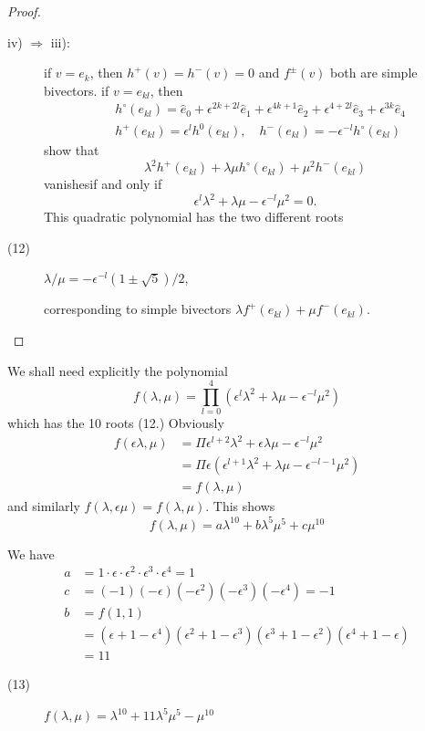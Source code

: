 \begin{proof}
\begin{description}
\item[iv) $\Rightarrow$ iii):] if $v=e_{k}$, then
$h^{+}(v)=h^{-}(v)=0$ and $f^{\pm}(v)$ both are simple bivectors. if
$v=e_{kl}$, then
\begin{align*}
&
h^{\circ}(e_{kl})=\widehat{e}_{0}+\epsilon^{2k+2l}\widehat{e}_{1}+\epsilon^{4k+1}\widehat{e}_{2}+\epsilon^{4+2l}\widehat{e}_{3}+\epsilon^{3k}\widehat{e}_{4}\\
& h^{+}(e_{kl})=\epsilon^{l}h^{0}(e_{kl}),\quad
h^{-}(e_{kl})=-\epsilon^{-l}h^{\circ}(e_{kl}) 
\end{align*}
show that
$$
\lambda^{2}h^{+}(e_{kl})+\lambda\mu
h^{\circ}(e_{kl})+\mu^{2}h^{-}(e_{kl}) 
$$
vanishes\pageoriginale if and only if
$$
\epsilon^{l}\lambda^{2}+\lambda\mu-\epsilon^{-l}\mu^{2}=0.
$$
This quadratic polynomial has the two different roots
\item[(12)]
$\lambda/\mu=-\epsilon^{-l}(1\pm \sqrt{5})/2$,

corresponding to simple bivectors $\lambda f^{+}(e_{kl})+\mu f^{-}(e_{kl})$.
\end{description}
\end{proof}

We shall need explicitly the polynomial
$$
f(\lambda,\mu)=\prod^{4}_{l=0}\left(\epsilon^{l}\lambda^{2}+\lambda\mu-\epsilon^{-l}\mu^{2}\right)
$$
which has the 10 roots (12.) Obviously
\begin{align*}
f(\epsilon \lambda,\mu) &
=\Pi \epsilon^{l+2}\lambda^{2}+\epsilon\lambda\mu-\epsilon^{-l}\mu^{2}\\
&=\Pi \epsilon(\epsilon^{l+1}\lambda^{2}+\lambda\mu-\epsilon^{-l-1}\mu^{2})\\
&= f(\lambda,\mu)
\end{align*}
and similarly $f(\lambda,\epsilon\mu)=f(\lambda,\mu)$. This shows
$$
f(\lambda,\mu)=a\lambda^{10}+b\lambda^{5}\mu^{5}+c\mu^{10}
$$

We have
\begin{align*}
a&
=1\cdot \epsilon \cdot \epsilon^{2}\cdot \epsilon^{3}\cdot \epsilon^{4}=1\\
c& =(-1)(-\epsilon)(-\epsilon^{2})(-\epsilon^{3})(-\epsilon^{4})=-1\\
b&= f(1,1)\\
 &=
 (\epsilon+1-\epsilon^{4})(\epsilon^{2}+1-\epsilon^{3})(\epsilon^{3}+1-\epsilon^{2})(\epsilon^{4}+1-\epsilon)\\
&= 11 
\end{align*}
\pageoriginale

\begin{description}
\item[(13)] $f(\lambda,\mu)=\lambda^{10}+11\lambda^{5}\mu^{5}-\mu^{10}$
\end{description}

